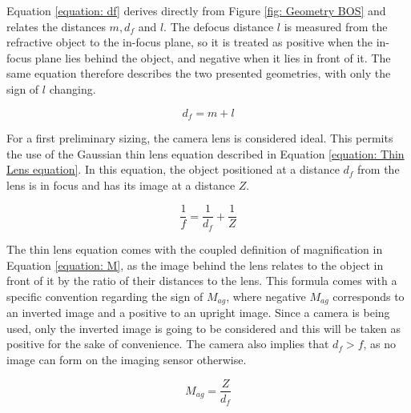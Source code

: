 \par Equation \ref{equation: df} derives directly from Figure \ref{fig: Geometry BOS} and relates the distances $m, d_f$ and $l$. The defocus distance $l$ is measured from the refractive object to the in-focus plane, so it is treated as positive when the in-focus plane lies behind the object, and negative when it lies in front of it. The same equation therefore describes the two presented geometries, with only the sign of $l$ changing.

\begin{equation}
    \label{equation: df}
    d_f = m + l
\end{equation}

\par For a first preliminary sizing, the camera lens is considered ideal. This permits the use of the Gaussian thin lens equation described in Equation \ref{equation: Thin Lens equation}. In this equation, the object positioned at a distance $d_f$ from the lens is in focus and has its image at a distance $Z$.

\begin{equation}
    \label{equation: Thin Lens equation}
    \frac{1}{f} = \frac{1}{d_f} + \frac{1}{Z}
\end{equation}

\par The thin lens equation comes with the coupled definition of magnification in Equation \ref{equation: M}, as the image behind the lens relates to the object in front of it by the ratio of their distances to the lens. This formula comes with a specific convention regarding the sign of $M_{ag}$, where negative $M_{ag}$ corresponds to an inverted image and a positive to an upright image. Since a camera is being used, only the inverted image is going to be considered and this will be taken as positive for the sake of convenience. The camera also implies that $d_f > f$, as no image can form on the imaging sensor otherwise.

\begin{equation}
    \label{equation: M}
    M_{ag} = \frac{Z}{d_f}
\end{equation}

